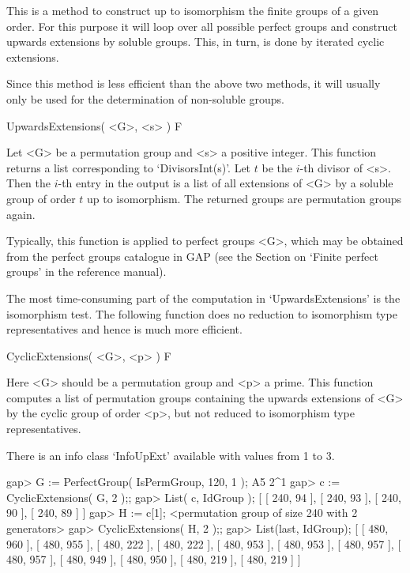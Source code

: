 


This is a method to construct up to isomorphism the finite groups of
a given order. For this purpose it will loop over all possible perfect
groups and construct upwards extensions by soluble groups. This, in turn,
is done by iterated cyclic extensions.

Since this method is less efficient than the above two methods, it
will usually only be used for the determination of non-soluble groups.

\> UpwardsExtensions( <G>, <s> ) F

Let <G> be a permutation group and <s> a positive integer.  This function
returns a list corresponding to `DivisorsInt(s)'.  Let $t$ be the $i$-th
divisor of <s>. Then the $i$-th entry in the output is a list of all
extensions of <G> by a soluble group of order $t$ up to isomorphism. The
returned groups are permutation groups again.

Typically, this function is applied to perfect groups <G>, which may be
obtained from the perfect groups catalogue in GAP (see the Section on
`Finite perfect groups' in the reference manual).

The most time-consuming part of the computation in `UpwardsExtensions'
is the isomorphism test. The following function does no reduction to
isomorphism type representatives and hence is much more efficient.

\> CyclicExtensions( <G>, <p> ) F

Here <G> should be a  permutation group and <p> a prime. This function
computes a list of permutation groups containing the upwards extensions
of <G> by the cyclic group of order <p>, but not reduced to isomorphism
type representatives.

There is an info class `InfoUpExt' available with values from 1 to 3.

\beginexample
gap> G := PerfectGroup( IsPermGroup, 120, 1 );
A5 2^1
gap> c := CyclicExtensions( G, 2 );;
gap> List( c, IdGroup );
[ [ 240, 94 ], [ 240, 93 ], [ 240, 90 ], [ 240, 89 ] ]
gap> H := c[1];
<permutation group of size 240 with 2 generators>
gap> CyclicExtensions( H, 2 );;
gap> List(last, IdGroup);
[ [ 480, 960 ], [ 480, 955 ], [ 480, 222 ], [ 480, 222 ], [ 480, 953 ], 
  [ 480, 953 ], [ 480, 957 ], [ 480, 957 ], [ 480, 949 ], [ 480, 950 ], 
  [ 480, 219 ], [ 480, 219 ] ]

